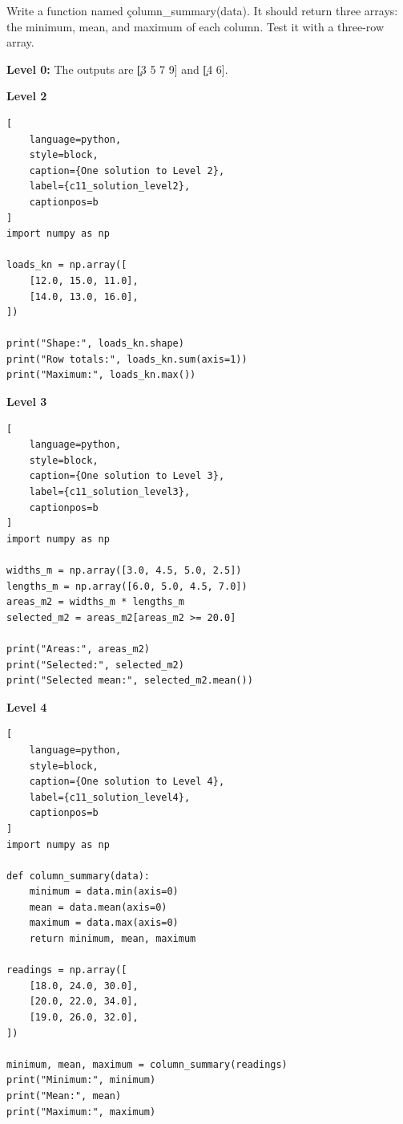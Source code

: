 
Write a function named \c{column_summary(data)}. It should return three arrays:
the minimum, mean, and maximum of each column. Test it with a three-row array.


\textbf{Level 0:} The outputs are \c{[3 5 7 9]} and \c{[4 6]}.

\textbf{Level 2}

\begin{lstlisting}[
    language=python,
    style=block,
    caption={One solution to Level 2},
    label={c11_solution_level2},
    captionpos=b
]
import numpy as np

loads_kn = np.array([
    [12.0, 15.0, 11.0],
    [14.0, 13.0, 16.0],
])

print("Shape:", loads_kn.shape)
print("Row totals:", loads_kn.sum(axis=1))
print("Maximum:", loads_kn.max())
\end{lstlisting}

\textbf{Level 3}

\begin{lstlisting}[
    language=python,
    style=block,
    caption={One solution to Level 3},
    label={c11_solution_level3},
    captionpos=b
]
import numpy as np

widths_m = np.array([3.0, 4.5, 5.0, 2.5])
lengths_m = np.array([6.0, 5.0, 4.5, 7.0])
areas_m2 = widths_m * lengths_m
selected_m2 = areas_m2[areas_m2 >= 20.0]

print("Areas:", areas_m2)
print("Selected:", selected_m2)
print("Selected mean:", selected_m2.mean())
\end{lstlisting}

\textbf{Level 4}

\begin{lstlisting}[
    language=python,
    style=block,
    caption={One solution to Level 4},
    label={c11_solution_level4},
    captionpos=b
]
import numpy as np

def column_summary(data):
    minimum = data.min(axis=0)
    mean = data.mean(axis=0)
    maximum = data.max(axis=0)
    return minimum, mean, maximum

readings = np.array([
    [18.0, 24.0, 30.0],
    [20.0, 22.0, 34.0],
    [19.0, 26.0, 32.0],
])

minimum, mean, maximum = column_summary(readings)
print("Minimum:", minimum)
print("Mean:", mean)
print("Maximum:", maximum)
\end{lstlisting}

